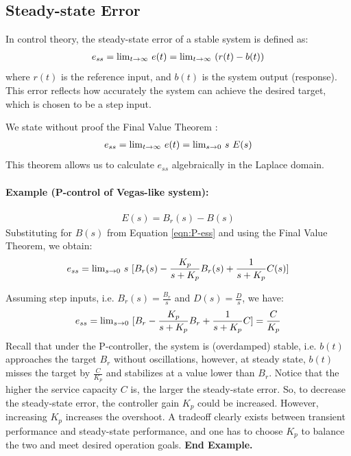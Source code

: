 \documentclass{article}
\def\lm{{\rm lim}}
\begin{document}
\subsection{Steady-state Error}

In control theory, the steady-state error of a stable system is defined as:
\begin{eqnarray*}
e_{ss} = \lm_{t \rightarrow \infty}\ e(t) = \lm_{t \rightarrow \infty}\  (r(t) - b(t))
\end{eqnarray*}
where $r(t)$ is the reference input, and $b(t)$ is the system output (response).
This error reflects how accurately the system can achieve the desired target,
which is chosen to be a step input.

We state without proof the Final Value Theorem \cite{Ogata:2010}:
\begin{eqnarray*}
e_{ss} = \lm_{t \rightarrow \infty}\ e(t) = \lm_{s \rightarrow 0}\ s\ E(s)
\end{eqnarray*}
This theorem allows us to calculate $e_{ss}$ algebraically in the Laplace domain.

\paragraph{Example (P-control of Vegas-like system):}
\begin{eqnarray*}
E(s) = B_r(s) - B(s)
\end{eqnarray*}
Substituting for $B(s)$ from Equation \ref{eqn:P-ess} and using the Final Value Theorem, we obtain:
\begin{eqnarray*}
e_{ss} = \lm_{s \rightarrow 0}\ s\ [B_r(s) - \frac{K_p}{s + K_p} B_r(s) + \frac{1}{s + K_p} C(s)]
\end{eqnarray*}

Assuming step inputs, i.e. $B_r(s) = \frac{B_r}{s}$ and $D(s) = \frac{D}{s}$, we have:
\begin{eqnarray*}
e_{ss} = \lm_{s \rightarrow 0}\ [B_r - \frac{K_p}{s + K_p} B_r + \frac{1}{s + K_p} C] = \frac{C}{K_p}
\end{eqnarray*}
Recall that under the P-controller, the system is (overdamped) stable, i.e. 
$b(t)$ approaches the target $B_r$ without oscillations, however,
at steady state, $b(t)$ misses the target by $\frac{C}{K_p}$ and 
stabilizes at a value lower than $B_r$.
Notice that the higher the service capacity $C$ is, the larger the steady-state error.
So, to decrease the steady-state error, the controller gain $K_p$ could be increased.
However, increasing $K_p$ increases the overshoot.
A tradeoff clearly exists between transient performance and steady-state performance,
and one has to choose $K_p$ to balance the two and meet desired operation goals.
 {\bf  End Example.}
\end{document}
